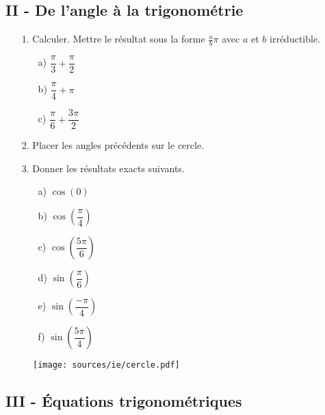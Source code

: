 \documentclass[12pt]{article}
\begin{document}
\subsection*{II - De l'angle à la trigonométrie}
\setlength{\columnseprule}{1pt}
\begin{multicols}{2}

  \begin{enumerate}
  \item[1.] Calculer. Mettre le résultat sous la forme $\frac{a}{b}\pi$ avec $a$ et $b$ irréductible.

    \begin{enumerate}
    \item[a)] $\dfrac{\pi}{3} + \dfrac{\pi}{2}$
    \item[b)] $\dfrac{\pi}{4} + \pi$
    \item[c)] $\dfrac{\pi}{6} + \dfrac{3\pi}{2}$
    \end{enumerate}

  \item[2.] Placer les angles précédents sur le cercle.
  \item[3.] Donner les résultats exacts suivants. 
    \setlength{\columnseprule}{0pt}
    \begin{multicols}{2}
      \begin{enumerate}
      \item[a)] $\cos(0)$
      \item[b)] $\cos(\dfrac{\pi}{4})$
      \item[c)] $\cos(\dfrac{5\pi}{6})$
      \item[d)] $\sin(\dfrac{\pi}{6})$
      \item[e)] $\sin(\dfrac{-\pi}{4})$
      \item[f)] $\sin(\dfrac{5\pi}{4})$
      \end{enumerate}
    \end{multicols}

  \end{enumerate}

  \begin{figure}[H]
    \centering
    \texttt{[image: sources/ie/cercle.pdf]}
  \end{figure}
\end{multicols}
\subsection*{III - Équations trigonométriques}
\end{document}

